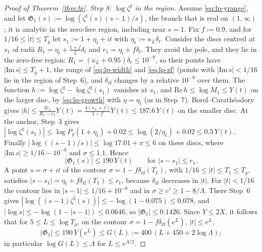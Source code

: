 \begin{proof}[Proof of Theorem~\ref{thm:lp}]
\emph{Step 8: $\log\zeta^\sharp$ in the region.} Assume \eqref{eq:lp-yrange}, and let $\mathfrak G_1(s):=\log(\zeta^\sharp(s)(s-1)/s)$,
the branch that is real on $(1,\infty)$; it is analytic in the zero-free region, including near $s=1$. Fix $f:=0.9$, and
for $1/16\le|t|\le T_y$ let $s_1:=1+\eta_t+it$ with $\eta_t:=\kappa_L\delta_t$. Consider the discs centred at $s_1$ of
radii $R_1=\eta_t+\frac{1+f}2\delta_t$ and $r_1=\eta_t+f\delta_t$. They avoid the pole, and they lie in the zero-free
region: $R_1=(\kappa_L+0.95)\delta_t\le10^{-9}$, so their points have $|\mathrm{Im}\,s|\le T_y+1$, the range of \eqref{eq:lp-width} and \eqref{eq:lp-zf} (points with $|\mathrm{Im}\,s|<1/16$ lie in the region of Step~6), and
$\delta_{\mathrm{zf}}$ changes by a relative $10^{-8}$ over them.
The function $h:=\log\zeta^\sharp-\log\zeta^\sharp(s_1)$ vanishes at $s_1$, and $\mathrm{Re}\,h\le\log M_1\le Y(t)$ on the larger disc, by
\eqref{eq:lp-growth} with $\eta=\eta_t$ (as in Step~7). Borel--Carath\'eodory gives
$|h|\le\frac{2r_1}{R_1-r_1}Y(t)=\frac{4(\kappa_L+f)}{1-f}Y(t)\le187.6\,Y(t)$ on the smaller disc. At the anchor, Step~3 gives
$|\log\zeta^\sharp(s_1)|\le\log P_y(1+\eta_t)+0.02\le\log(2/\eta_t)+0.02\le0.5\,Y(t)$. Finally
$|\log((s-1)/s)|\le\log17.01+\pi\le6$ on these discs, where $|\mathrm{Im}\,s|\ge1/16-10^{-9}$ and $\sigma\le1.1$. Hence
\[
  |\mathfrak G_1(s)|\le190\,Y(t)\qquad\text{for }|s-s_1|\le r_1 .
\]
A point $s=\sigma+it$ of the contour $\sigma=1-f\delta_{\mathrm{zf}}(T_1)$, with $1/16\le|t|\le T_1\le T_y$, satisfies
$|s-s_1|=\eta_t+f\delta_{\mathrm{zf}}(T_1)\le r_1$, because $\delta_{\mathrm{zf}}$ decreases in $|t|$. For $|t|<1/16$ the contour
lies in $|s-1|\le1/16+10^{-8}$ and in $\sigma\ge c'\ge1-8/\Lambda$. There Step~6 gives $|\log((s-1)\zeta^\sharp(s))|\le-\log(1-0.075)\le0.078$, and
$|\log s|\le-\log(1-|s-1|)\le0.0646$, so $|\mathfrak G_1|\le0.1426$. Since
$Y\le2X$, it follows that for $5\le L\le\log T_y$, on the contour $\sigma=1-f\delta_{\mathrm{zf}}(e^L)$, $|t|\le e^L$,
\[
  |\mathfrak G_1|\le190\,Y(e^L)\le G(L):=400\,(L+450+2\log\Lambda);
\]
in particular $\log G(L)\le\Lambda$ for $L\le e^{\Lambda/2}$.


\end{proof}
